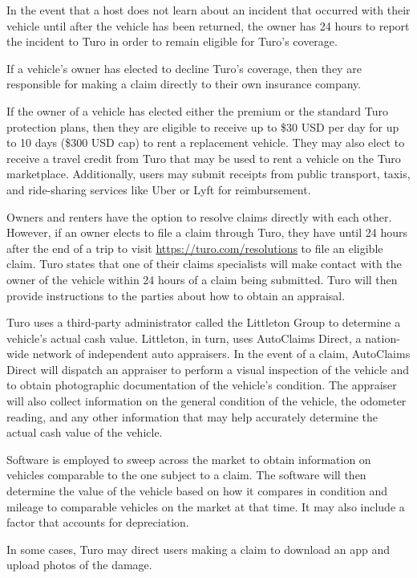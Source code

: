 \documentclass[review,12pt]{elsarticle}
\begin{document}
In the event that a host does not learn about an incident that occurred with their vehicle until after the vehicle has been returned, the owner has 24 hours to report the incident to Turo in order to remain eligible for Turo's coverage.

If a vehicle's owner has elected to decline Turo's coverage, then they are responsible for making a claim directly to their own insurance company.

If the owner of a vehicle has elected either the premium or the standard Turo protection plans, then they are eligible to receive up to \$30 USD per day for up to 10 days (\$300 USD cap) to rent a replacement vehicle. They may also elect to receive a travel credit from Turo that may be used to rent a vehicle on the Turo marketplace. Additionally, users may submit receipts from public transport, taxis, and ride-sharing services like Uber or Lyft for reimbursement.

Owners and renters have the option to resolve claims directly with each other. However, if an owner elects to file a claim through Turo, they have until 24 hours after the end of a trip to visit \url{https://turo.com/resolutions} to file an eligible claim. Turo states that one of their claims specialists will make contact with the owner of the vehicle within 24 hours of a claim being submitted. Turo will then provide instructions to the parties about how to obtain an appraisal.

Turo uses a third-party administrator called the Littleton Group to determine a vehicle's actual cash value. Littleton, in turn, uses AutoClaims Direct, a nation-wide network of independent auto appraisers. In the event of a claim, AutoClaims Direct will dispatch an appraiser to perform a visual inspection of the vehicle and to obtain photographic documentation of the vehicle's condition. The appraiser will also collect information on the general condition of the vehicle, the odometer reading, and any other information that may help accurately determine the actual cash value of the vehicle.

Software is employed to sweep across the market to obtain information on  vehicles comparable to the one subject to a claim. The software will then determine the value of the vehicle based on how it compares in condition and mileage to comparable vehicles on the market at that time. It may also include a factor that accounts for depreciation.

In some cases, Turo may direct users making a claim to download an app and upload photos of the damage.
\end{document}
